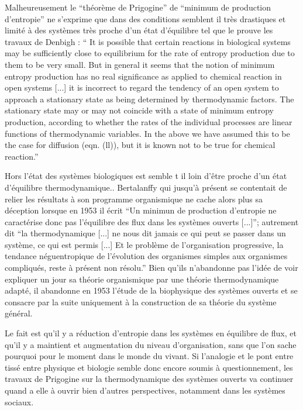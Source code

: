 Malheureusement le \enquote{théorème de Prigogine} de \enquote{minimum de production d'entropie} ne s'exprime que dans des conditions semblent il très drastiques \autocite[53]{Lebon2008} et limité à des systèmes très proche d'un état d'équilibre tel que le prouve les travaux de Denbigh : \enquote{ It is possible that certain reactions in biological systems may be sufficiently close to equilibrium for the rate of entropy production due to them to be very small. But in general it seems that the notion of minimum entropy production has no real significance as applied to chemical reaction in open systems [...] it is incorrect to regard the tendency of an open system to approach a stationary state as being determined by thermodynamic factors. The stationary state may or may not coincide with a state of minimum entropy production, according to whether the rates of the individual processes are linear functions of thermodynamic variables. In the above we have assumed this to be the case for diffusion (eqn. (ll)), but it is known not to be true for chemical reaction.} \autocite{Denbigh1952}

Hors l'état des systèmes biologiques est semble t il loin d'être proche d'un état d'équilibre thermodynamique.. Bertalanffy qui jusqu'à présent se contentait de relier les résultats à son programme organismique ne cache alors plus sa déception lorsque en 1953 il écrit \enquote{Un minimun de production d'entropie ne caractérise donc pas l'équilibre des flux dans les systèmes ouverts [...]}; autrement dit \enquote{la thermodynamique [...] ne nous dit jamais ce qui peut se passer dans un système, ce qui est permis [...] Et le problème de l'organisation progressive, la tendance néguentropique de l'évolution des organismes simples aux organismes compliqués, reste à présent non résolu.} Bien qu'ils n'abandonne pas l'idée de voir expliquer un jour sa théorie organismique par une théorie thermodynamique adapté, il abandonne en 1953 l'étude de la biophysique des systèmes ouverts et se consacre par la suite uniquement à la construction de sa théorie du système général.

Le fait est qu'il y a réduction d'entropie dans les systèmes en équilibre de flux, et qu'il y a maintient et augmentation du niveau d'organisation, sans que l'on sache pourquoi pour le moment dans le monde du vivant. Si l'analogie et le pont entre tissé entre physique et biologie semble donc encore soumis à questionnement, les travaux de Prigogine sur la thermodynamique des systèmes ouverts va continuer quand a elle à ouvrir bien d'autres perspectives, notamment dans les systèmes sociaux.

